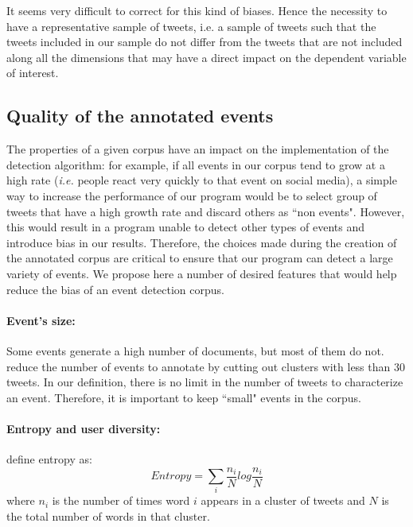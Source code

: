 It seems very difficult to correct for this kind of biases. Hence the necessity to have a representative sample of tweets, i.e. a sample of tweets such that the tweets included in our sample do not differ from the tweets that are not included along all the dimensions that may have a direct impact on the dependent variable of interest.

\subsection{Quality of the annotated events}

The properties of a given corpus have an impact on the implementation of the detection algorithm: for example, if all events in our corpus tend to grow at a high rate (\textit{i.e.} people react very quickly to that event on social media), a simple way to increase the performance of our program would be to select group of tweets that have a high growth rate and discard others as ``non events". However, this would result in a program unable to detect other types of events and introduce bias in our results. Therefore, the choices made during the creation of the annotated corpus are critical to ensure that our program can detect a large variety of events. We propose here a number of desired features that would help reduce the bias of an event detection corpus.
	
		
		\paragraph{\textbf{Event's size:}}
		Some events generate a high number of documents, but most of them do not. \citet{mcminn_building_2013} reduce the number of events to annotate by cutting out clusters with less than 30 tweets. In our definition, there is no limit in the number of tweets to characterize an event. Therefore, it is important to keep ``small" events in the corpus.
		
		\paragraph{\textbf{Entropy and user diversity:}}
		\citet{petrovic_streaming_2010} define entropy as:
		$$
		Entropy = \sum_i\frac{n_i}{N}log\frac{n_i}{N}
		$$
		where $n_i$ is the number of times word $i$ appears in a cluster of tweets and $N$ is the total number of words in that cluster.
		
